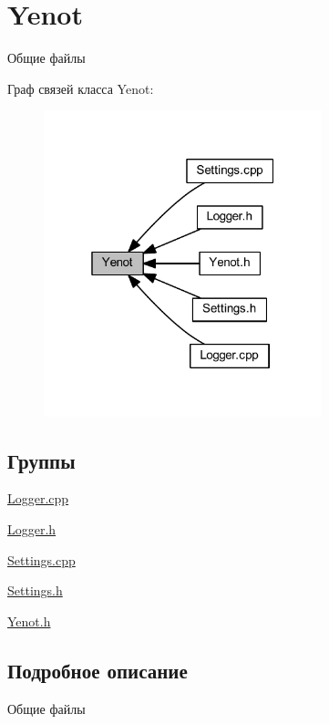 \hypertarget{group__yenot}{}\section{Yenot}
\label{group__yenot}


Общие файлы  


Граф связей класса Yenot\+:
\nopagebreak
\begin{figure}[H]
\begin{center}
\leavevmode
\includegraphics[width=229pt]{group__yenot}
\end{center}
\end{figure}
\subsection*{Группы}
\begin{DoxyCompactItemize}
\item 
\mbox{\hyperlink{group__loggercpp}{Logger.\+cpp}}
\item 
\mbox{\hyperlink{group__loggerh}{Logger.\+h}}
\item 
\mbox{\hyperlink{group__settingscpp}{Settings.\+cpp}}
\item 
\mbox{\hyperlink{group__settingsh}{Settings.\+h}}
\item 
\mbox{\hyperlink{group__yenoth}{Yenot.\+h}}
\end{DoxyCompactItemize}


\subsection{Подробное описание}
Общие файлы 

